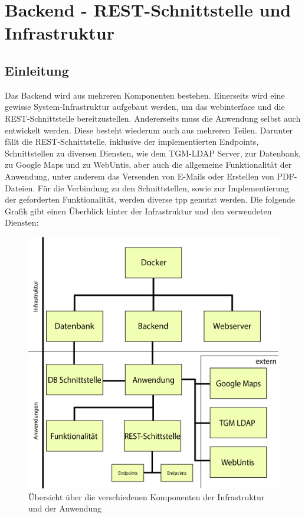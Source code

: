 
\section{Backend - REST-Schnittstelle und Infrastruktur}
	\subsection{Einleitung}
	Das Backend wird aus mehreren Komponenten bestehen. Einerseits wird eine gewisse System-Infrastruktur aufgebaut werden, um das \gls{webinterface} und die REST-Schnittstelle bereitzustellen. Andererseits muss die Anwendung selbst auch entwickelt werden. Diese besteht wiederum auch aus mehreren Teilen. Darunter fällt die REST-Schnittstelle, inklusive der implementierten Endpoints, Schnittstellen zu diversen Diensten, wie dem TGM-LDAP Server, zur Datenbank, zu Google Maps und zu WebUntis, aber auch die allgemeine Funktionalität der Anwendung, unter anderem das Versenden von E-Mails oder Erstellen von PDF-Dateien. Für die Verbindung zu den Schnittstellen, sowie zur Implementierung der geforderten Funktionalität, werden diverse  \gls{tpp} genutzt werden. Die folgende Grafik gibt einen Überblick hinter der Infrastruktur und den verwendeten Diensten:
	\begin{figure}[H]
		\centering
		\includegraphics[width=0.8\linewidth]{images/uebersicht}
		\caption[Übersicht über die Komponenten]{Übersicht über die verschiedenen Komponenten der Infrastruktur und der Anwendung}
		\label{fig:uebersicht}
	\end{figure}
	
